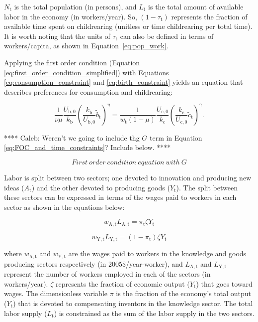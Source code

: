 \documentclass[letterpaper,12pt]{article}
\begin{document}
\noindent $N_\mathrm{t}$ is the total population (in persons), and $L_\mathrm{t}$ is the total amount of available labor in the economy (in workers/year). So, $(1-\tau_\mathrm{t})$ represents the fraction of available time spent on childrearing (unitless or time childrearing per total time). It is worth noting that the units of $\tau_\mathrm{t}$ can also be defined in terms of workers/capita, as shown in Equation~\ref{eq:pop_work}.

Applying the first order condition (Equation \ref{eq:first_order_condition_simplified}) with Equations \ref{eq:consumption_constraint} and \ref{eq:birth_constraint} yields an equation that describes preferences for consumption and childrearing:

\begin{equation} \label{eq:FOC_and_time_constraints}
	\frac{1}{\nu \mu} \frac{U_\mathrm{b,0}}{k_\mathrm{b}} \left( \frac{k_\mathrm{b}}{U_\mathrm{b,0}} \tilde b_\mathrm{t} \right) ^{\eta} 
	= \frac{1}{w_\mathrm{t}(1-\mu)} \frac{U_\mathrm{c,0}}{k_\mathrm{c}}  \left( \frac{k_\mathrm{c}}{U_\mathrm{c,0}} \tilde c_\mathrm{t} \right)^\gamma .
\end{equation}

**** Caleb: Weren't we going to include thg $G$ term in Equation \ref{eq:FOC_and_time_constraints}? Include below. ****

\begin{equation} \label{eq:FOC_with_G}
  First~order~condition~equation~with~G
\end{equation}

Labor is split between two sectors; one devoted to innovation and producing new ideas ($A_\mathrm{t}$) and the other devoted to producing goods ($Y_\mathrm{t}$). The split between these sectors can be expressed in terms of the wages paid to workers in each sector as shown in the equations below:

\begin{equation} \label{eq:knowledge_comp}
	w_\mathrm{A,t} L_\mathrm{A,t} = \pi_\mathrm{t} \zeta Y_\mathrm{t}
\end{equation}

\begin{equation} \label{eq:labor_comp}
	w_\mathrm{Y,t} L_\mathrm{Y,t} = (1-\pi_\mathrm{t}) \zeta Y_\mathrm{t}
\end{equation}

\noindent where $w_\mathrm{A,t}$ and $w_\mathrm{Y,t}$ are the wages paid to workers in the knowledge and goods producing sectors respectively (in 2005\$/year-worker), and $L_\mathrm{A,t}$ and $L_\mathrm{Y,t}$ represent the number of workers employed in each of the sectors (in workers/year). $\zeta$ represents the fraction of economic output ($Y_\mathrm{t}$) that goes toward wages. The dimensionless variable $\pi$ is the fraction of the economy's total output ($Y_\mathrm{t}$) that is devoted to compensating inventors in the knowledge sector. The total labor supply ($L_\mathrm{t}$) is constrained as the sum of the labor supply in the two sectors.
\end{document}
